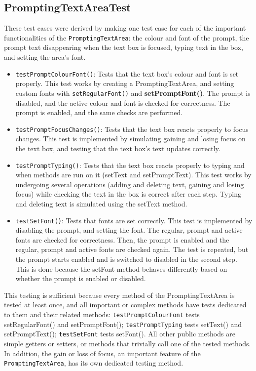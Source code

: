 \documentclass[11pt]{article}
\begin{document}
\subsection{PromptingTextAreaTest}
\label{sec:orgc9b9c2a}
These test cases were derived by making one test case for each of the important functionalities of the \texttt{PromptingTextArea}: the colour and font of the prompt, the prompt text disappearing when the text box is focused, typing text in the box, and setting the area's font.
\begin{itemize}
\item \texttt{testPromptColourFont()}: Tests that the text box's colour and font is set properly.  
This test works by creating a PromptingTextArea, and setting custom fonts with \texttt{setRegularFont()} and \textbf{setPromptFont()}.  The prompt is disabled, and the active colour and font is checked for correctness.  The prompt is enabled, and the same checks are performed.
\item \texttt{testPromptFocusChanges()}: Tests that the text box reacts properly to focus changes.  
This test is implemented by simulating gaining and losing focus on the text box, and testing that the text box's text updates correctly.
\item \texttt{testPromptTyping()}: Tests that the text box reacts properly to typing and when methods are run on it (setText and setPromptText).  
This test works by undergoing several operations (adding and deleting text, gaining and losing focus) while checking the text in the box is correct after each step.  Typing and deleting text is simulated using the setText method.
\item \texttt{testSetFont()}: Tests that fonts are set correctly.  
This test is implemented by disabling the prompt, and setting the font.  The regular, prompt and active fonts are checked for correctness.  Then, the prompt is enabled and the regular, prompt and active fonts are checked again.  The test is repeated, but the prompt starts enabled and is switched to disabled in the second step.  This is done because the setFont method behaves differently based on whether the prompt is enabled or disabled.
\end{itemize}

This testing is sufficient because every method of the PromptingTextArea is tested at least once, and all important or complex methods have tests dedicated to them and their related methods: \texttt{testPromptColourFont} tests setRegularFont() and setPromptFont(); \texttt{testPromptTyping} tests setText() and setPromptText(); \texttt{testSetFont} tests setFont().  All other public methods are simple getters or setters, or methods that trivially call one of the tested methods.  In addition, the gain or loss of focus, an important feature of the \texttt{PromptingTextArea}, has its own dedicated testing method.
\end{document}
